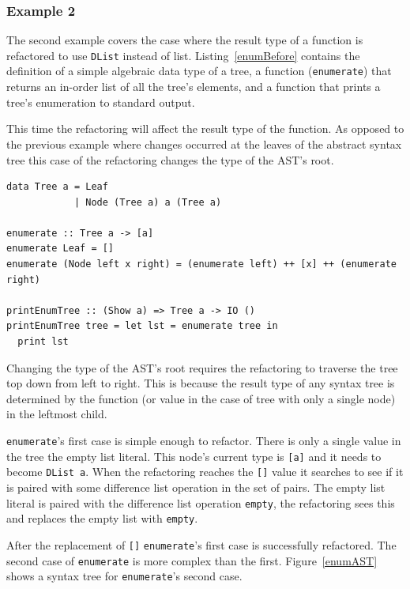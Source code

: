 \subsubsection{Example 2}

The second example covers the case where the result type of a function is refactored to use \texttt{DList} instead of list. Listing~\ref{enumBefore} contains the definition of a simple algebraic data type of a tree, a function (\texttt{enumerate}) that returns an in-order list of all the tree's elements, and a function that prints a tree's enumeration to standard output. 

This time the refactoring will affect the result type of the function. As opposed to the previous example where changes occurred at the leaves of the abstract syntax tree this case of the refactoring changes the type of the AST's root. 

\begin{lstlisting}[caption={Definition of enumerate}, label=enumBefore]
data Tree a = Leaf
            | Node (Tree a) a (Tree a)

enumerate :: Tree a -> [a]
enumerate Leaf = []
enumerate (Node left x right) = (enumerate left) ++ [x] ++ (enumerate right)

printEnumTree :: (Show a) => Tree a -> IO ()
printEnumTree tree = let lst = enumerate tree in
  print lst
\end{lstlisting}

Changing the type of the AST's root requires the refactoring to traverse the tree top down from left to right. This is because the result type of any syntax tree is determined by the function (or value in the case of tree with only a single node) in the leftmost child. 

\texttt{enumerate}'s first case is simple enough to refactor. There is only a single value in the tree the empty list literal. This node's current type is \texttt{[a]} and it needs to become \texttt{DList a}. When the refactoring reaches the \texttt{[]} value it searches to see if it is paired with some difference list operation in the set of pairs. The empty list literal is paired with the difference list operation \texttt{empty}, the refactoring sees this and replaces the empty list with \texttt{empty}.

After the replacement of \texttt{[]} \texttt{enumerate}'s first case is successfully refactored. The second case of \texttt{enumerate} is more complex than the first. Figure~\ref{enumAST} shows a syntax tree for \texttt{enumerate}'s second case. 

